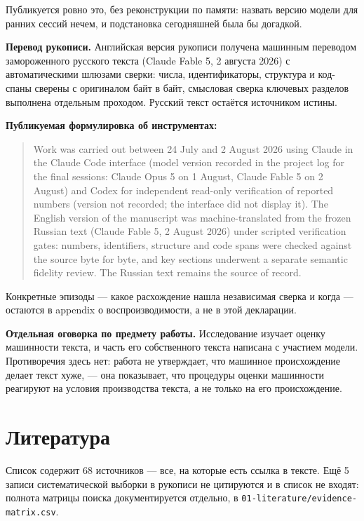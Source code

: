 \documentclass[11pt,a4paper]{article}
\renewcommand{\_}{\textunderscore\allowbreak}
\begin{document}
Публикуется ровно это, без реконструкции по памяти: назвать версию модели для
ранних сессий нечем, и подстановка сегодняшней была бы догадкой.

\textbf{Перевод рукописи.} Английская версия рукописи получена машинным переводом
замороженного русского текста (Claude Fable 5, 2 августа 2026) с
автоматическими шлюзами сверки: числа, идентификаторы, структура и код-спаны
сверены с оригиналом байт в байт, смысловая сверка ключевых разделов выполнена
отдельным проходом. Русский текст остаётся источником истины.

\textbf{Публикуемая формулировка об инструментах:}

\begin{quote}
Work was carried out between 24 July and 2 August 2026 using Claude in the Claude
Code interface (model version recorded in the project log for the final sessions:
Claude Opus 5 on 1 August, Claude Fable 5 on 2 August) and Codex for independent
read-only verification of reported numbers (version not recorded; the interface
did not display it). The English version of the manuscript was machine-translated
from the frozen Russian text (Claude Fable 5, 2 August 2026) under scripted
verification gates: numbers, identifiers, structure and code spans were checked
against the source byte for byte, and key sections underwent a separate semantic
fidelity review. The Russian text remains the source of record.
\end{quote}

Конкретные эпизоды — какое расхождение нашла независимая сверка и когда — остаются в
appendix о воспроизводимости, а не в этой декларации.

\textbf{Отдельная оговорка по предмету работы.} Исследование изучает оценку машинности
текста, и часть его собственного текста написана с участием модели. Противоречия
здесь нет: работа не утверждает, что машинное происхождение делает текст хуже, — она
показывает, что процедуры оценки машинности реагируют на условия производства
текста, а не только на его происхождение.

\section{Литература}

Список содержит 68 источников — все, на которые есть ссылка в тексте. Ещё 5 записи систематической выборки в рукописи не цитируются и в список не входят: полнота матрицы поиска документируется отдельно, в \texttt{01-\allowbreak{}literature/evidence-\allowbreak{}matrix.csv}.
\end{document}
